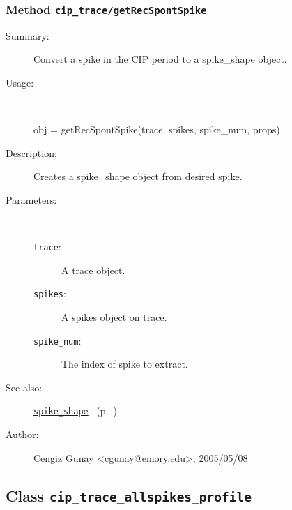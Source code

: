 \subsubsection[Method \texttt{getRecSpontSpike}]{Method \texttt{cip\_trace/getRecSpontSpike}}%
%
\label{ref_cip_trace__getRecSpontSpike}%
\hypertarget{ref_cip_trace__getRecSpontSpike}{}%
\begin{description}
\item[Summary:]Convert a spike in the CIP period to a spike\_shape object.
%
\item[Usage:]~%
\begin{lyxcode}%
obj = getRecSpontSpike(trace, spikes, spike\_num, props)
%
\end{lyxcode}%
%
\item[Description:]%
Creates a spike\_shape object from desired spike.
\item[Parameters:]~
\begin{description}%
\item[\texttt{trace}:]
 A trace object.
\item[\texttt{spikes}:]
 A spikes object on trace.
\item[\texttt{spike\_num}:]
 The index of spike to extract.
\end{description}%
%
%
%
\item[See also:]%
\hyperlink{ref_spike_shape}{\texttt{spike\_shape}}%
\ (p.~\pageref{ref_spike_shape})%
%
%
\item[Author:]%
Cengiz Gunay <cgunay@emory.edu>, 2005/05/08%
\end{description}
\methodline%
\subsection{Class \texttt{cip\_trace\_allspikes\_profile}}%
%
\label{ref_cip_trace_allspikes_profile}%
\hypertarget{ref_cip_trace_allspikes_profile}{}%
